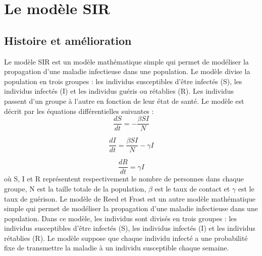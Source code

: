 \section{Le modèle SIR}
        \subsection{Histoire et amélioration}

Le modèle SIR est un modèle mathématique simple qui permet de modéliser la propagation d'une maladie infectieuse dans une population. Le modèle divise la population en trois groupes : les individus susceptibles d'être infectés (S), les individus infectés (I) et les individus guéris ou rétablies (R). Les individus passent d'un groupe à l'autre en fonction de leur état de santé. Le modèle est décrit par les équations différentielles suivantes :
$$\frac{dS}{dt} = -\frac{\beta SI}{N}$$

$$\frac{dI}{dt} = \frac{\beta SI}{N} - \gamma I$$

$$\frac{dR}{dt} = \gamma I$$
où S, I et R représentent respectivement le nombre de personnes dans chaque groupe, N est la taille totale de la population, $\beta$ est le taux de contact et $\gamma$ est le taux de guérison. Le modèle de Reed et Frost est un autre modèle mathématique simple qui permet de modéliser la propagation d'une maladie infectieuse dans une population. Dans ce modèle, les individus sont divisés en trois groupes : les individus susceptibles d'être infectés (S), les individus infectés (I) et les individus rétablies (R). Le modèle suppose que chaque individu infecté a une probabilité fixe de transmettre la maladie à un individu susceptible chaque semaine.


